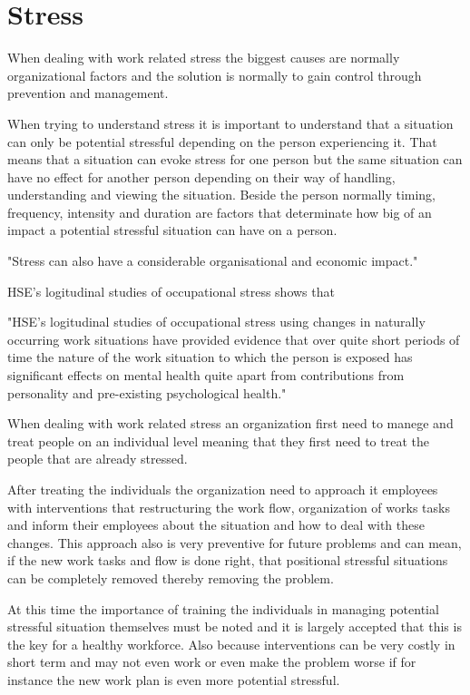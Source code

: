 \section{Stress}
When dealing with work related stress the biggest causes are normally organizational factors and the solution is normally to gain control through prevention and management.

When trying to understand stress it is important to understand that a situation can only be potential stressful depending on the person experiencing it. That means that a situation can evoke stress for one person but the same situation can have no effect for another person depending on their way of handling, understanding and viewing the situation. Beside the person normally timing, frequency, intensity and duration are factors that determinate how big of an impact a potential stressful situation can have on a person.

"Stress can also have a considerable organisational and economic impact."

HSE's  logitudinal studies of occupational stress shows that 

"HSE's  logitudinal studies of occupational stress using changes in naturally occurring work situations have provided evidence that over quite short periods of time the nature of the work situation to which the person is exposed has significant effects on mental health quite apart from contributions from personality and pre-existing psychological health."

When dealing with work related stress an organization first need to manege and treat people on an individual level meaning that they first need to treat the people that are already stressed.

After treating the individuals the organization need to approach it employees with interventions that restructuring the work flow, organization of works tasks and inform their employees about the situation and how to deal with these changes. This approach also is very preventive for future problems and can mean, if the new work tasks and flow is done right, that positional stressful situations can be completely removed thereby removing the problem.

At this time the importance of training the individuals in managing potential stressful situation themselves must be noted and it is largely accepted that this is the key for a healthy workforce. Also because interventions can be very costly in short term and may not even work or even make the problem worse if for instance the new work plan is even more potential stressful.

